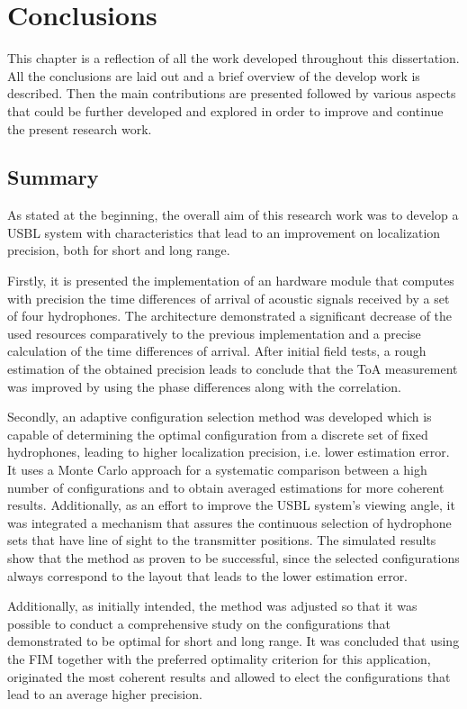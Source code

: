 \chapter{Conclusions}  \label{chap:conclusion}

This chapter is a reflection of all the work developed throughout this dissertation. All the conclusions are laid out and a brief overview of the develop work is described. Then the main contributions are presented followed by various aspects that could be further developed and explored in order to improve and continue the present research work. 

\section{Summary}

As stated at the beginning, the overall aim of this research work was to develop a USBL system with characteristics that lead to an improvement on localization precision, both for short and long range.

Firstly, it is presented the implementation of an hardware module that computes with precision the time differences of arrival of acoustic signals received by a set of four hydrophones. The architecture demonstrated a significant decrease of the used resources comparatively to the previous implementation and a precise calculation of the time differences of arrival. After initial field tests, a rough estimation of the obtained precision leads to conclude that the ToA measurement was improved by using the phase differences along with the correlation.

Secondly, an adaptive configuration selection method was developed which is capable of determining the optimal configuration from a discrete set of fixed hydrophones, leading to higher localization precision, i.e. lower estimation error. It uses a Monte Carlo approach for a systematic comparison between a high number of configurations and to obtain averaged estimations for more coherent results. Additionally, as an effort to improve the USBL system's viewing angle, it was integrated a mechanism that assures the continuous selection of hydrophone sets that have line of sight to the transmitter positions. The simulated results show that the method as proven to be successful, since the selected configurations always correspond to the layout that leads to the lower estimation error.

Additionally, as initially intended, the method was adjusted so that it was possible to conduct a comprehensive study on the configurations that demonstrated to be optimal for short and long range. It was concluded that using the FIM together with the preferred optimality criterion for this application, originated the most coherent results and allowed to elect the configurations that lead to an average higher precision.

